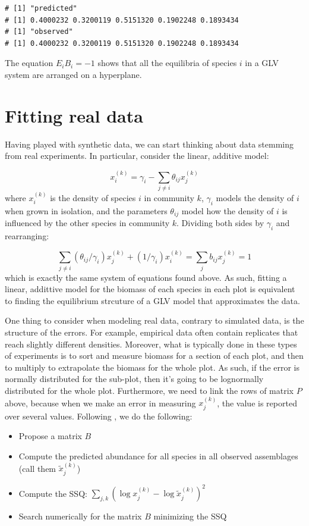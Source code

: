 \documentclass[]{book}
\providecommand{\tightlist}{%
  \setlength{\itemsep}{0pt}\setlength{\parskip}{0pt}}
\begin{document}
\begin{verbatim}
# [1] "predicted"
# [1] 0.4000232 0.3200119 0.5151320 0.1902248 0.1893434
# [1] "observed"
# [1] 0.4000232 0.3200119 0.5151320 0.1902248 0.1893434
\end{verbatim}

The equation \(E_i B_i = -1\) shows that all the equilibria of species \(i\) in a GLV system are arranged on a hyperplane.

\hypertarget{fitting-real-data}{%
\section{Fitting real data}\label{fitting-real-data}}

Having played with synthetic data, we can start thinking about data stemming from real experiments. In particular, consider the linear, additive model:

\[
x_i^{(k)} = \gamma_i - \sum_{j\neq i} \theta_{ij} x_j^{(k)}
\]
where \(x_i^{(k)}\) is the density of species \(i\) in community \(k\), \(\gamma_i\) models the density of \(i\) when grown in isolation, and the parameters \(\theta_{ij}\) model how the density of \(i\) is influenced by the other species in community \(k\). Dividing both sides by \(\gamma_i\) and rearranging:

\[
\sum_{j\neq i} (\theta_{ij} /\gamma_i) x_j^{(k)} + (1/{\gamma_i}) x_i^{(k)}= \sum_j b_{ij} x_j^{(k)} = 1
\]
which is exactly the same system of equations found above. As such, fitting a linear, addittive model for the biomass of each species in each plot is equivalent to finding the equilibrium strcuture of a GLV model that approximates the data.

One thing to consider when modeling real data, contrary to simulated data, is the structure of the errors. For example, empirical data often contain replicates that reach slightly different densities. Moreover, what is typically done in these types of experiments is to sort and measure biomass for a section of each plot, and then to multiply to extrapolate the biomass for the whole plot. As such, if the error is normally distributed for the sub-plot, then it's going to be lognormally distributed for the whole plot. Furthermore, we need to link the rows of matrix \(P\) above, because when we make an error in measuring \(x_j^{(k)}\), the value is reported over several values. Following \citet{maynard2019predicting}, we do the following:

\begin{itemize}
\tightlist
\item
  Propose a matrix \(B\)
\item
  Compute the predicted abundance for all species in all observed assemblages (call them \(\tilde{x}_j^{(k)}\))
\item
  Compute the SSQ: \(\sum_{j, k} (\log x_j^{(k)} - \log \tilde{x}_j^{(k)})^2\)
\item
  Search numerically for the matrix \(B\) minimizing the SSQ
\end{itemize}
\end{document}
